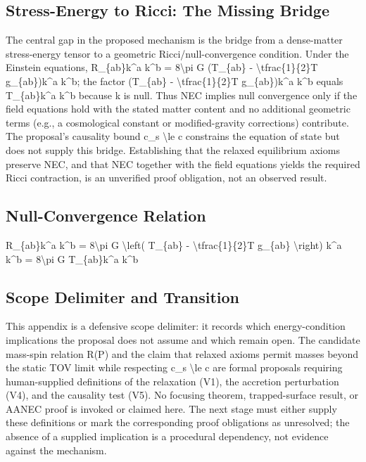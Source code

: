 \documentclass[conference]{IEEEtran}
\begin{document}
\subsection{Stress-Energy to Ricci: The Missing Bridge}
The central gap in the proposed mechanism is the bridge from a dense-matter stress-energy tensor to a geometric Ricci/null-convergence condition. Under the Einstein equations, R\_\{ab\}k\textasciicircum{}a k\textasciicircum{}b = 8\textbackslash{}pi G (T\_\{ab\} - \textbackslash{}tfrac\{1\}\{2\}T g\_\{ab\})k\textasciicircum{}a k\textasciicircum{}b; the factor (T\_\{ab\} - \textbackslash{}tfrac\{1\}\{2\}T g\_\{ab\})k\textasciicircum{}a k\textasciicircum{}b equals T\_\{ab\}k\textasciicircum{}a k\textasciicircum{}b because k is null. Thus NEC implies null convergence only if the field equations hold with the stated matter content and no additional geometric terms (e.g., a cosmological constant or modified-gravity corrections) contribute. The proposal's causality bound c\_s \textbackslash{}le c constrains the equation of state but does not supply this bridge. Establishing that the relaxed equilibrium axioms preserve NEC, and that NEC together with the field equations yields the required Ricci contraction, is an unverified proof obligation, not an observed result.

\subsection{Null-Convergence Relation}
R\_\{ab\}k\textasciicircum{}a k\textasciicircum{}b = 8\textbackslash{}pi G \textbackslash{}left( T\_\{ab\} - \textbackslash{}tfrac\{1\}\{2\}T g\_\{ab\} \textbackslash{}right) k\textasciicircum{}a k\textasciicircum{}b = 8\textbackslash{}pi G T\_\{ab\}k\textasciicircum{}a k\textasciicircum{}b~\cite{cite_37ecbded9d629353}

\subsection{Scope Delimiter and Transition}
This appendix is a defensive scope delimiter: it records which energy-condition implications the proposal does not assume and which remain open. The candidate mass-spin relation R(P) and the claim that relaxed axioms permit masses beyond the static TOV limit while respecting c\_s \textbackslash{}le c are formal proposals requiring human-supplied definitions of the relaxation (V1), the accretion perturbation (V4), and the causality test (V5). No focusing theorem, trapped-surface result, or AANEC proof is invoked or claimed here. The next stage must either supply these definitions or mark the corresponding proof obligations as unresolved; the absence of a supplied implication is a procedural dependency, not evidence against the mechanism.
\end{document}
